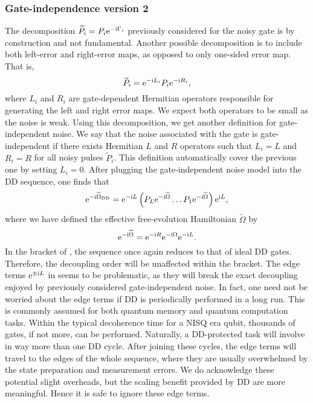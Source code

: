\documentclass[pra,reprint,superscriptaddress]{revtex4-2}
\newcommand{\wtP}{\widetilde{P}}
\newcommand{\wtO}{\widetilde{\Omega}}
\newcommand{\rDD}{\mathrm{DD}}
\begin{document}
\subsubsection{Gate-independence version 2}
The decomposition $\wtP_i = P_i \upe^{-\upi \Gamma_i}$  previously considered for the noisy gate is by construction and not fundamental. 
Another possible decomposition is to include both left-error and right-error maps, as opposed to only one-sided error map. That is,
\begin{equation}\label{eq:leftright-noise}
 \wtP_i = \upe^{-\upi L_i} P_i \upe^{-\upi R_i},
\end{equation}
where $L_i$ and $R_i$ are gate-dependent Hermitian operators responsible for generating the left and right error maps.  We expect both operators  to be small as the noise is weak.
Using this decomposition, we get another definition for gate-independent noise. We say that the noise associated with the gate is gate-independent if there exists Hermitian $L$ and $R$ operators such that 
$L_i=L$ and $R_i = R$ for all noisy pulses $\wtP_i$. This definition automatically cover the previous one by setting $L_i=0$.
After plugging the gate-independent noise model into the DD sequence, one finds that 
\begin{equation}\label{eq:gateindep}
 \upe^{-\upi\wtO_\rDD} = \upe^{-\upi L} \left( P_L \upe^{-\upi \wtO} \ldots  P_1 \upe^{-\upi \wtO } \right) \upe^{\upi L},
\end{equation}
where we have defined the effective free-evolution Hamiltonian $\wtO$ by 
\begin{equation}
 \upe^{-\upi \wtO} = \upe^{-\upi R}  \upe^{-\upi \Omega}  \upe^{-\upi L}.
\end{equation}
In the bracket of , the sequence once again reduces to that of ideal DD gates. Therefore, the decoupling order will be unaffected within the bracket. The edge terms  $\mathrm{e}^{\pm \mathrm{i} L}$ in   seems to be problematic, as they will break the exact decoupling enjoyed by previously considered gate-independent noise. 
In fact, one need not be worried about the edge terms if DD is periodically performed in a long run. This is commonly assumed for both quantum memory and quantum computation tasks. Within the typical decoherence time for a NISQ era qubit, thousands of gates, if not more, can be performed. Naturally, a DD-protected task will involve in way more than one DD cycle. 
After joining these cycles, the edge terms will travel to the edges of the whole sequence, where they are usually overwhelmed by the state preparation and measurement errors. 
We do acknowledge these potential slight overheads, but the scaling benefit provided by DD are more meaningful. Hence it is safe to ignore these edge terms. 
\end{document}
